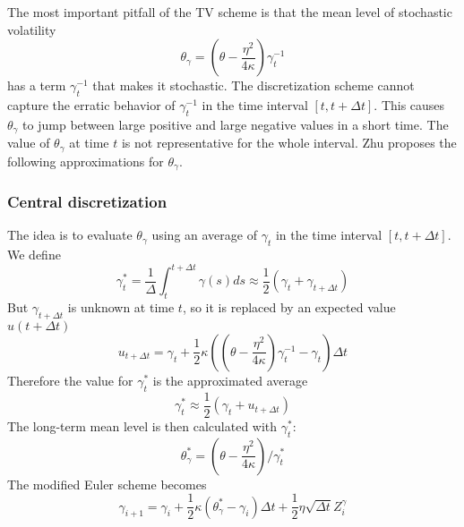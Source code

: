\documentclass[12pt]{article}
\numberwithin{equation}{section}
\begin{document}
The most important pitfall of the TV scheme is that the mean level of stochastic volatility
\begin{equation}
\theta_\gamma = \left( \theta - \frac{\eta^2}{4\kappa} \right) \gamma_t^{-1}
\end{equation}
has a term $\gamma_t^{-1}$ that makes it stochastic. The discretization scheme cannot capture the erratic behavior of $\gamma_t^{-1}$ in the time interval $[t, t + \Delta t]$. This causes $\theta_\gamma$ to jump between large positive and large negative values in a short time. The value of $\theta_\gamma$ at time $t$ is not representative for the whole interval. Zhu proposes the following approximations for $\theta_\gamma$.
\subsubsection*{Central discretization}
The idea is to evaluate $\theta_\gamma$ using an average of $\gamma_t$ in the time interval $[t, t + \Delta t]$. We define
\begin{equation*}
\gamma^*_t = \frac{1}{\Delta} \int_{t}^{t+\Delta t} \gamma(s)ds \approx \frac{1}{2}(\gamma_t + \gamma_{t+\Delta t})
\end{equation*}
But $\gamma_{t+\Delta t}$ is unknown at time $t$, so it is replaced by an expected value $u(t+\Delta t)$
\begin{equation*}
u_{t+\Delta t} = \gamma_t + \frac{1}{2}\kappa \left( \left( \theta - \frac{\eta^2}{4\kappa} \right) \gamma_t^{-1} - \gamma_t \right) \Delta t
\end{equation*}
Therefore the value for $\gamma^*_t$ is the approximated average
\begin{equation}
\gamma^*_t \approx \frac{1}{2}(\gamma_t + u_{t+\Delta t})
\end{equation}
The long-term mean level is then calculated with $\gamma^*_t$:
\begin{equation}
\theta^*_\gamma =  \left( \theta - \frac{\eta^2}{4\kappa} \right) \Big/ \gamma^*_t
\end{equation}
The modified Euler scheme becomes
\begin{equation}
\gamma_{i+1} = \gamma_{i} + \frac{1}{2}\kappa(\theta^*_\gamma - \gamma_{i})\Delta t + \frac{1}{2}\eta\sqrt{\Delta t}Z_i^\gamma
\end{equation}
\end{document}

